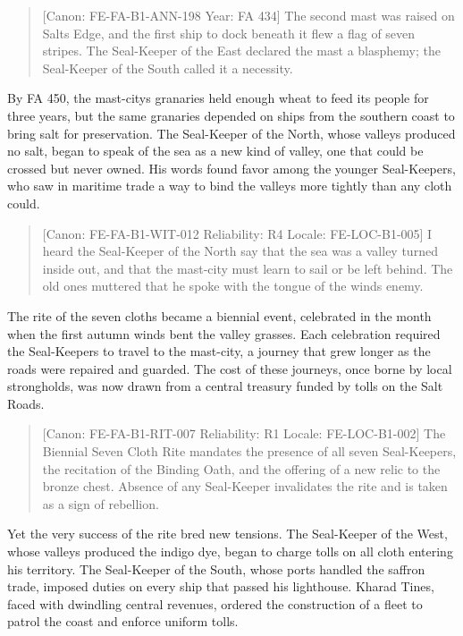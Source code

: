\begin{quote}
{[}Canon: FE-FA-B1-ANN-198 \textbar{} Year: FA 434{]} The second mast
was raised on Salt\textquotesingle s Edge, and the first ship to dock
beneath it flew a flag of seven stripes. The Seal-Keeper of the East
declared the mast a blasphemy; the Seal-Keeper of the South called it a
necessity.
\end{quote}

By FA 450, the mast-city\textquotesingle s granaries held enough wheat
to feed its people for three years, but the same granaries depended on
ships from the southern coast to bring salt for preservation. The
Seal-Keeper of the North, whose valleys produced no salt, began to speak
of the sea as a new kind of valley, one that could be crossed but never
owned. His words found favor among the younger Seal-Keepers, who saw in
maritime trade a way to bind the valleys more tightly than any cloth
could.

\begin{quote}
{[}Canon: FE-FA-B1-WIT-012 \textbar{} Reliability: R4 \textbar{} Locale:
FE-LOC-B1-005{]} I heard the Seal-Keeper of the North say that the sea
was a valley turned inside out, and that the mast-city must learn to
sail or be left behind. The old ones muttered that he spoke with the
tongue of the wind\textquotesingle s enemy.
\end{quote}

The rite of the seven cloths became a biennial event, celebrated in the
month when the first autumn winds bent the valley grasses. Each
celebration required the Seal-Keepers to travel to the mast-city, a
journey that grew longer as the roads were repaired and guarded. The
cost of these journeys, once borne by local strongholds, was now drawn
from a central treasury funded by tolls on the Salt Roads.

\begin{quote}
{[}Canon: FE-FA-B1-RIT-007 \textbar{} Reliability: R1 \textbar{} Locale:
FE-LOC-B1-002{]} The Biennial Seven Cloth Rite mandates the presence of
all seven Seal-Keepers, the recitation of the Binding Oath, and the
offering of a new relic to the bronze chest. Absence of any Seal-Keeper
invalidates the rite and is taken as a sign of rebellion.
\end{quote}

Yet the very success of the rite bred new tensions. The Seal-Keeper of
the West, whose valleys produced the indigo dye, began to charge tolls
on all cloth entering his territory. The Seal-Keeper of the South, whose
ports handled the saffron trade, imposed duties on every ship that
passed his lighthouse. Kharad Tines, faced with dwindling central
revenues, ordered the construction of a fleet to patrol the coast and
enforce uniform tolls.

